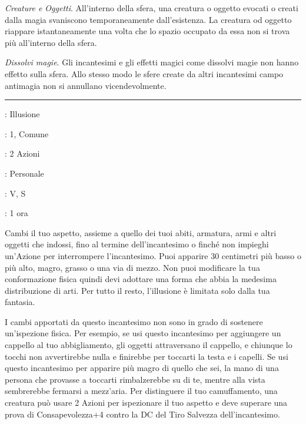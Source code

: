 \begin{multicols}{2}
\emph{Creature e Oggetti}. All'interno della sfera, una creatura o oggetto evocati o creati dalla magia svaniscono temporaneamente dall'esistenza. La creatura od oggetto riappare istantaneamente una volta che lo spazio occupato da essa non si trova più all'interno della sfera.

\emph{Dissolvi magie}. Gli incantesimi e gli effetti magici come dissolvi magie non hanno effetto sulla sfera. Allo stesso modo le sfere create da altri incantesimi campo antimagia non si annullano vicendevolmente.

\smallskip\noindent\rule{\linewidth}{2pt} \hypertarget{Camuffare Sé Stesso}{}\smallskip{}
\noindent
\begin{description}[noitemsep, topsep=0pt, parsep=0pt, partopsep=0pt, leftmargin=0cm, labelwidth=2.8cm]
	\item[\textbf{Lista di Magia}]: Illusione
	\item[\textbf{Livello}]: 1, Comune
	\item[\textbf{T. di Lancio}]: 2 Azioni
	\item[\textbf{Gittata}]: Personale
	\item[\textbf{Componenti}]: V, S
	\item[\textbf{Durata}]: 1 ora
\end{description}

Cambi il tuo aspetto, assieme a quello dei tuoi abiti, armatura, armi e altri oggetti che indossi, fino al termine dell'incantesimo o finché non impieghi un'Azione per interrompere l'incantesimo. Puoi apparire 30 centimetri più basso o più alto, magro, grasso o una via di mezzo. Non puoi modificare la tua conformazione fisica quindi devi adottare una forma che abbia la medesima distribuzione di arti. Per tutto il resto, l'illusione è limitata solo dalla tua fantasia.

I cambi apportati da questo incantesimo non sono in grado di sostenere un'ispezione fisica. Per esempio, se usi questo incantesimo per aggiungere un cappello al tuo abbigliamento, gli oggetti attraversano il cappello, e chiunque lo tocchi non avvertirebbe nulla e finirebbe per toccarti la testa e i capelli. Se usi questo incantesimo per apparire più magro di quello che sei, la mano di una persona che provasse a toccarti rimbalzerebbe su di te, mentre alla vista sembrerebbe fermarsi a mezz'aria. Per distinguere il tuo camuffamento, una creatura può usare 2 Azioni per ispezionare il tuo aspetto e deve superare una prova di Consapevolezza+4 contro la DC del Tiro Salvezza dell'incantesimo.


\end{multicols}
